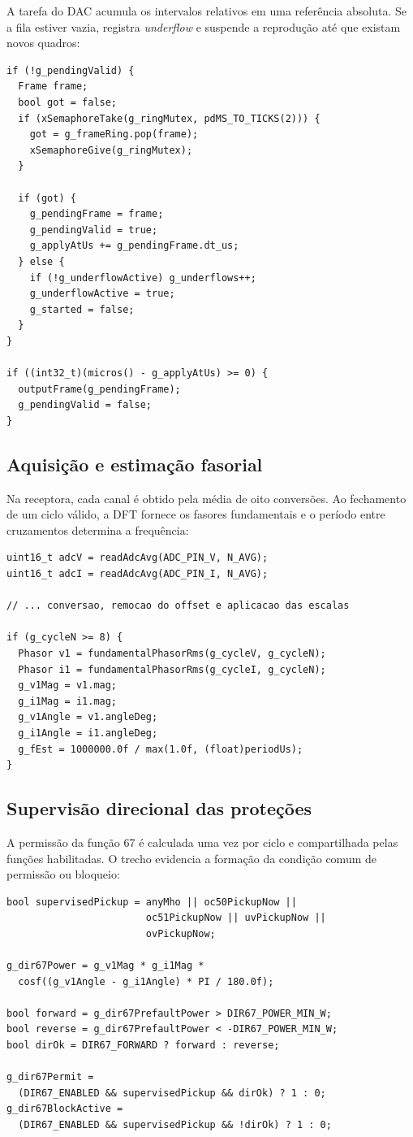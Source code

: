 A tarefa do DAC acumula os intervalos relativos em uma referência absoluta. Se a fila estiver vazia, registra \textit{underflow} e suspende a reprodução até que existam novos quadros:

\begin{verbatim}
if (!g_pendingValid) {
  Frame frame;
  bool got = false;
  if (xSemaphoreTake(g_ringMutex, pdMS_TO_TICKS(2))) {
    got = g_frameRing.pop(frame);
    xSemaphoreGive(g_ringMutex);
  }

  if (got) {
    g_pendingFrame = frame;
    g_pendingValid = true;
    g_applyAtUs += g_pendingFrame.dt_us;
  } else {
    if (!g_underflowActive) g_underflows++;
    g_underflowActive = true;
    g_started = false;
  }
}

if ((int32_t)(micros() - g_applyAtUs) >= 0) {
  outputFrame(g_pendingFrame);
  g_pendingValid = false;
}
\end{verbatim}

\subsection{Aquisição e estimação fasorial}

Na receptora, cada canal é obtido pela média de oito conversões. Ao fechamento de um ciclo válido, a DFT fornece os fasores fundamentais e o período entre cruzamentos determina a frequência:

\begin{verbatim}
uint16_t adcV = readAdcAvg(ADC_PIN_V, N_AVG);
uint16_t adcI = readAdcAvg(ADC_PIN_I, N_AVG);

// ... conversao, remocao do offset e aplicacao das escalas

if (g_cycleN >= 8) {
  Phasor v1 = fundamentalPhasorRms(g_cycleV, g_cycleN);
  Phasor i1 = fundamentalPhasorRms(g_cycleI, g_cycleN);
  g_v1Mag = v1.mag;
  g_i1Mag = i1.mag;
  g_v1Angle = v1.angleDeg;
  g_i1Angle = i1.angleDeg;
  g_fEst = 1000000.0f / max(1.0f, (float)periodUs);
}
\end{verbatim}

\subsection{Supervisão direcional das proteções}

A permissão da função 67 é calculada uma vez por ciclo e compartilhada pelas funções habilitadas. O trecho evidencia a formação da condição comum de permissão ou bloqueio:

\begin{verbatim}
bool supervisedPickup = anyMho || oc50PickupNow ||
                        oc51PickupNow || uvPickupNow ||
                        ovPickupNow;

g_dir67Power = g_v1Mag * g_i1Mag *
  cosf((g_v1Angle - g_i1Angle) * PI / 180.0f);

bool forward = g_dir67PrefaultPower > DIR67_POWER_MIN_W;
bool reverse = g_dir67PrefaultPower < -DIR67_POWER_MIN_W;
bool dirOk = DIR67_FORWARD ? forward : reverse;

g_dir67Permit =
  (DIR67_ENABLED && supervisedPickup && dirOk) ? 1 : 0;
g_dir67BlockActive =
  (DIR67_ENABLED && supervisedPickup && !dirOk) ? 1 : 0;
\end{verbatim}

